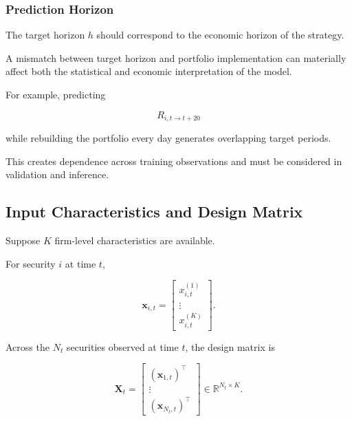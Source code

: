 \documentclass[11pt,a4paper]{article}
\begin{document}
\subsubsection{Prediction Horizon}

The target horizon $h$ should correspond to the economic horizon of the
strategy.

A mismatch between target horizon and portfolio implementation can materially
affect both the statistical and economic interpretation of the model.

For example, predicting

\begin{equation}
R_{i,t\rightarrow t+20}
\end{equation}

while rebuilding the portfolio every day generates overlapping target periods.

This creates dependence across training observations and must be considered in
validation and inference.


\subsection{Input Characteristics and Design Matrix}
\label{subsec:input_design_matrix}

Suppose $K$ firm-level characteristics are available.

For security $i$ at time $t$,

\begin{equation}
\mathbf{x}_{i,t}
=
\begin{bmatrix}
x_{i,t}^{(1)}
\\
\vdots
\\
x_{i,t}^{(K)}
\end{bmatrix}.
\end{equation}

Across the $N_t$ securities observed at time $t$, the design matrix is

\begin{equation}
\boxed{
\mathbf{X}_t
=
\begin{bmatrix}
(\mathbf{x}_{1,t})^\top
\\
\vdots
\\
(\mathbf{x}_{N_t,t})^\top
\end{bmatrix}
\in
\mathbb{R}^{N_t\times K}.
}
\end{equation}
\end{document}

